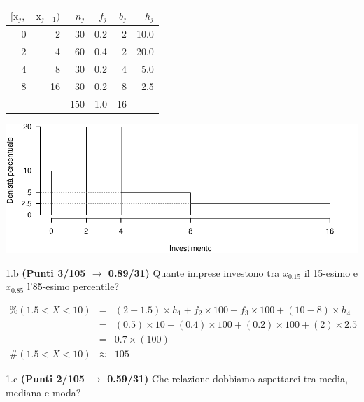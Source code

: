 \documentclass[
  11pt,
]{book}
\theoremstyle{mytheoremstyle}
\theoremstyle{mydefstyle}
\newenvironment{sol}
  {
  \begin{tcolorbox}[enhanced,breakable,arc=0.1mm,boxrule=1pt,colback=white,colframe=iblue,
  title=\bf \fontfamily{lmss}\selectfont \hspace{.5 cm} Soluzione,drop fuzzy shadow]

}{
\end{tcolorbox}
  }
\begin{document}
\begin{sol}

\begin{table}[H]
\centering
\begin{tabular}{rrrrrr}
\toprule
$[\text{x}_j,$ & $\text{x}_{j+1})$ & $n_j$ & $f_j$ & $b_j$ & $h_j$\\
\midrule
0 & 2 & 30 & 0.2 & 2 & 10.0\\
2 & 4 & 60 & 0.4 & 2 & 20.0\\
4 & 8 & 30 & 0.2 & 4 & 5.0\\
8 & 16 & 30 & 0.2 & 8 & 2.5\\
 &  & 150 & 1.0 & 16 & \\
\bottomrule
\end{tabular}
\end{table}

\begin{center}\includegraphics{Esami_passati_con_soluzioni_files/figure-latex/2024-106-1} \end{center}

\end{sol}

1.b \textbf{(Punti 3/105 \(\rightarrow\) 0.89/31)} Quante imprese investono tra \(x_{0.15}\) il 15-esimo e \(x_{0.85}\) l'85-esimo percentile?

\begin{sol}
\begin{eqnarray*} \%(1.5<X<10) &=& (2-1.5)\times h_{1}+ f_{ 2 }\times 100+f_{ 3 }\times 100 + (10-8)\times h_{4}  \\ 
 &=& (0.5)\times 10+ ( 0.4 )\times 100+( 0.2 )\times 100 + (2)\times 2.5  \\ 
 &=&  0.7 \times(100)\\
     \#( 1.5 < X < 10 ) &\approx& 105 
         \end{eqnarray*}

\end{sol}

1.c \textbf{(Punti 2/105 \(\rightarrow\) 0.59/31)} Che relazione dobbiamo aspettarci tra media, mediana e moda?
\end{document}
